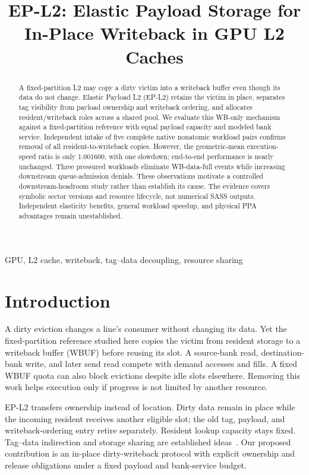 \documentclass[conference,letterpaper]{IEEEtran}
\newcommand{\epl}{EP-L2}
\begin{document}
\title{EP-L2: Elastic Payload Storage for\\In-Place Writeback in GPU L2 Caches}
\author{}
\maketitle
\begin{abstract}
A fixed-partition L2 may copy a dirty victim into a writeback buffer even though its data do not change. Elastic Payload L2 (EP-L2) retains the victim in place, separates tag visibility from payload ownership and writeback ordering, and allocates resident/writeback roles across a shared pool. We evaluate this WB-only mechanism against a fixed-partition reference with equal payload capacity and modeled bank service. Independent intake of five complete native nonatomic workload pairs confirms removal of all resident-to-writeback copies. However, the geometric-mean execution-speed ratio is only 1.001600, with one slowdown; end-to-end performance is nearly unchanged. Three pressured workloads eliminate WB-data-full events while increasing downstream queue-admission denials. These observations motivate a controlled downstream-headroom study rather than establish its cause. The evidence covers symbolic sector versions and resource lifecycle, not numerical SASS outputs. Independent elasticity benefits, general workload speedup, and physical PPA advantages remain unestablished.
\end{abstract}
\begin{IEEEkeywords}
GPU, L2 cache, writeback, tag--data decoupling, resource sharing
\end{IEEEkeywords}

\section{Introduction}
A dirty eviction changes a line's consumer without changing its data. Yet the fixed-partition reference studied here copies the victim from resident storage to a writeback buffer (WBUF) before reusing its slot. A source-bank read, destination-bank write, and later send read compete with demand accesses and fills. A fixed WBUF quota can also block evictions despite idle slots elsewhere. Removing this work helps execution only if progress is not limited by another resource.

\epl{} transfers ownership instead of location. Dirty data remain in place while the incoming resident receives another eligible slot; the old tag, payload, and writeback-ordering entry retire separately. Resident lookup capacity stays fixed. Tag--data indirection and storage sharing are established ideas~\cite{vway,unified,farkas,micache}. Our proposed contribution is an in-place dirty-writeback protocol with explicit ownership and release obligations under a fixed payload and bank-service budget.
\end{document}
